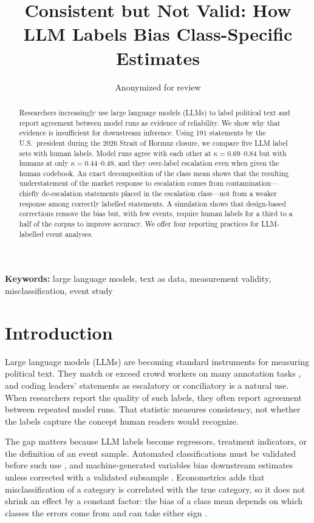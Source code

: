 \documentclass[12pt]{article}
\title{Consistent but Not Valid: How LLM Labels Bias Class-Specific Estimates}
\author{Anonymized for review}
\date{}
\begin{document}
\maketitle

\begin{abstract}
\noindent Researchers increasingly use large language models (LLMs) to label political text and report agreement between model runs as evidence of reliability. We show why that evidence is insufficient for downstream inference. Using 191 statements by the U.S.\ president during the 2026 Strait of Hormuz closure, we compare five LLM label sets with human labels. Model runs agree with each other at $\kappa = 0.69$--$0.84$ but with humans at only $\kappa = 0.44$--$0.49$, and they over-label escalation even when given the human codebook. An exact decomposition of the class mean shows that the resulting understatement of the market response to escalation comes from contamination---chiefly de-escalation statements placed in the escalation class---not from a weaker response among correctly labelled statements. A simulation shows that design-based corrections remove the bias but, with few events, require human labels for a third to a half of the corpus to improve accuracy. We offer four reporting practices for LLM-labelled event analyses.
\end{abstract}

\noindent\textbf{Keywords:} large language models, text as data, measurement validity, misclassification, event study

\clearpage

\section{Introduction}

Large language models (LLMs) are becoming standard instruments for measuring political text. They match or exceed crowd workers on many annotation tasks \citep{gilardi2023, ziems2024}, and coding leaders' statements as escalatory or conciliatory is a natural use. When researchers report the quality of such labels, they often report agreement between repeated model runs. That statistic measures consistency, not whether the labels capture the concept human readers would recognize.

The gap matters because LLM labels become regressors, treatment indicators, or the definition of an event sample. Automated classifications must be validated before such use \citep{grimmer2013}, and machine-generated variables bias downstream estimates unless corrected with a validated subsample \citep{yang2018, fong2021, knox2022, angelopoulos2023, egami2023, teblunthuis2024}. Econometrics adds that misclassification of a category is correlated with the true category, so it does not shrink an effect by a constant factor: the bias of a class mean depends on which classes the errors come from and can take either sign \citep{aigner1973, bound2001, mahajan2006, lewbel2007}.
\end{document}
